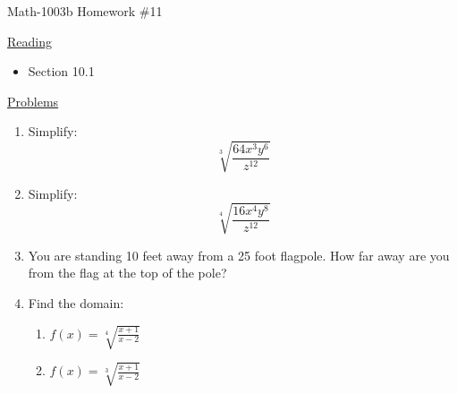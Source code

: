 \documentclass[letterpaper,12pt,fleqn]{article}
\begin{document}
\begin{center}
\Large Math-1003b Homework \#11
\end{center}

\vspace{0.5in}

\underline{Reading}

\bigskip

\begin{itemize}
\item Section 10.1
\end{itemize}

\bigskip

\underline{Problems}

\bigskip

\begin{enumerate}
\item Simplify:
  \[\sqrt[3]{\frac{64x^3y^6}{z^{12}}}\]

\item Simplify:
  \[\sqrt[4]{\frac{16x^4y^8}{z^{12}}}\]

\item You are standing 10 feet away from a 25 foot flagpole. How far away are you from
  the flag at the top of the pole?

\item Find the domain:
  \begin{enumerate}
  \item $f(x)=\sqrt[4]{\frac{x+1}{x-2}}$
  \item $f(x)=\sqrt[3]{\frac{x+1}{x-2}}$
  \end{enumerate}
\end{enumerate}
\end{document}
